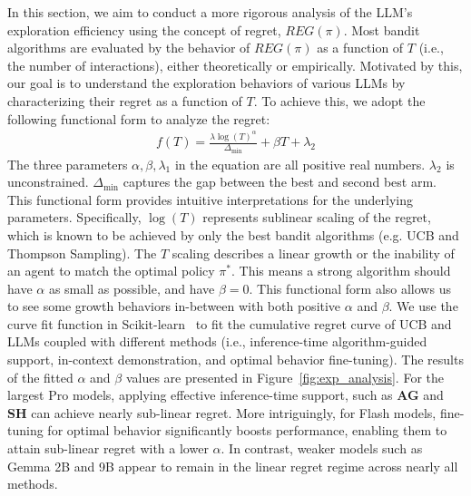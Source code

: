 In this section, we aim to conduct a more rigorous analysis of the LLM's exploration efficiency using the concept of regret, $REG(\pi)$. Most bandit algorithms are evaluated by the behavior of $REG(\pi)$ as a function of $T$ (i.e., the number of interactions), either theoretically or empirically. 
Motivated by this, our goal is to understand the exploration behaviors of various LLMs by characterizing their regret as a function of $T$. To achieve this, we adopt the following functional form to analyze the regret:
\begin{align}
 f(T) = \frac{\lambda \log(T)^{\alpha}}{\Delta_{\min}} + \beta T + \lambda_2
\end{align}
The three parameters $\alpha, \beta, \lambda_1$ in the equation are all positive real numbers. $\lambda_2$ is unconstrained. $\Delta_{\min}$ captures the gap between the best and second best arm.
This functional form provides intuitive interpretations for the underlying parameters. Specifically, $\log(T)$ represents sublinear scaling of the regret, which is known to be achieved by only the best bandit algorithms (e.g. UCB and Thompson Sampling). The $T$ scaling describes a linear growth or the inability of an agent to match the optimal policy $\pi^*$. This means a strong algorithm should have $\alpha$ as small as possible, and have $\beta=0$. This functional form also allows us to see some growth behaviors in-between with both positive $\alpha$ and $\beta$.
We use the curve fit function in Scikit-learn~\citep{pedregosa2011scikit} to fit the cumulative regret curve of UCB and LLMs coupled with different methods (i.e., inference-time algorithm-guided support, in-context demonstration, and optimal behavior fine-tuning).
The results of the fitted $\alpha$ and $\beta$ values are presented in Figure~\ref{fig:exp_analysis}. 
For the largest Pro models, applying effective inference-time support, such as \textbf{AG} and \textbf{SH} can achieve nearly sub-linear regret. More intriguingly, for Flash models, fine-tuning for optimal behavior significantly boosts performance, enabling them to attain sub-linear regret with a lower $\alpha$. In contrast, weaker models such as Gemma 2B and 9B appear to remain in the linear regret regime across nearly all methods.
